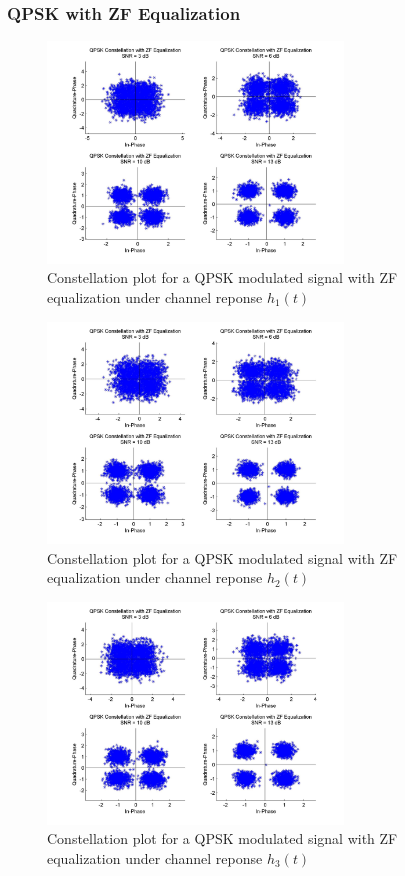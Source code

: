 \documentclass[]{article}
\begin{document}
\subsubsection{QPSK with ZF Equalization}

\begin{figure}[H]
\centering
\includegraphics[width=0.7\textwidth]{qpConstZF1.jpg}
\caption{Constellation plot for a QPSK modulated signal with ZF equalization under channel reponse $h_1(t)$}
\end{figure}

\begin{figure}[H]
\centering
\includegraphics[width=0.7\textwidth]{qpConstZF2.jpg}
\caption{Constellation plot for a QPSK modulated signal with ZF equalization under channel reponse $h_2(t)$}
\end{figure}

\begin{figure}[H]
\centering
\includegraphics[width=0.7\textwidth]{qpConstZF3.jpg}
\caption{Constellation plot for a QPSK modulated signal with ZF equalization under channel reponse $h_3(t)$}
\end{figure}
\end{document}
